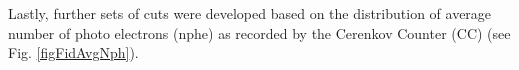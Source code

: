 %

Lastly, further sets of cuts were developed based on the distribution of average number of photo electrons (nphe) as recorded by the Cerenkov Counter (CC) (see Fig. \ref{figFidAvgNph}).

